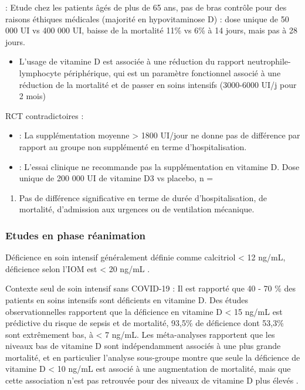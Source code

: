 \documentclass[
  a4paper,
  DIV=11,
  numbers=noendperiod,
  listof=totoc]{scrreprt}
\providecommand{\tightlist}{%
  \setlength{\itemsep}{0pt}\setlength{\parskip}{0pt}}\usepackage{longtable,booktabs,array}
\begin{document}
\autocite{Annweiler.2022} : Etude chez les patients âgés de plus de 65
ans, pas de bras contrôle pour des raisons éthiques médicales (majorité
en hypovitaminose D) : dose unique de 50 000 UI vs 400 000 UI, baisse de
la mortalité 11\% vs 6\% à 14 jours, mais pas à 28 jours.

\begin{itemize}
\tightlist
\item
  L'usage de vitamine D est associée à une réduction du rapport
  neutrophile-lymphocyte périphérique, qui est un paramètre fonctionnel
  associé à une réduction de la mortalité et de passer en soins
  intensifs (3000-6000 UI/j pour 2 mois) \autocite{Maghbooli.2021}
\end{itemize}

RCT contradictoires :

\begin{itemize}
\item
  \textcite{Cereda.2021} : La supplémentation moyenne \textgreater{}
  1800 UI/jour ne donne pas de différence par rapport au groupe non
  supplémenté en terme d'hospitalisation.
\item
  \textcite{Murai.2021} : L'essai clinique ne recommande pas la
  supplémentation en vitamine D. Dose unique de 200 000 UI de vitamine
  D3 vs placebo, n =
\end{itemize}

\begin{enumerate}
\def\labelenumi{\arabic{enumi}.}
\setcounter{enumi}{119}
\tightlist
\item
  Pas de différence significative en terme de durée d'hospitalisation,
  de mortalité, d'admission aux urgences ou de ventilation mécanique.
\end{enumerate}

\subsubsection{Etudes en phase
réanimation}\label{etudes-en-phase-ruxe9animation}

Déficience en soin intensif généralement définie comme calcitriol
\textless{} 12 ng/mL, déficience selon l'IOM est \textless{} 20 ng/mL
\autocite{Cutuli.2024}.

Contexte seul de soin intensif sans COVID-19 : Il est rapporté que 40 -
70 \% des patients en soins intensifs sont déficients en vitamine D. Des
études observationnelles rapportent que la déficience en vitamine D
\textless{} 15 ng/mL est prédictive du risque de sepsis et de mortalité,
93,5\% de déficience dont 53,3\% sont extrêmement bas, à \textless{} 7
ng/mL. Les méta-analyses rapportent que les niveaux bas de vitamine D
sont indépendamment associés à une plus grande mortalité, et en
particulier l'analyse sous-groupe montre que seule la déficience de
vitamine D \textless{} 10 ng/mL est associé à une augmentation de
mortalité, mais que cette association n'est pas retrouvée pour des
niveaux de vitamine D plus élevés \autocite{Cutuli.2024}.
\end{document}
